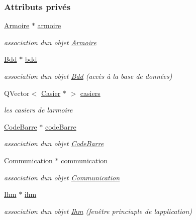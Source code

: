 \subsubsection*{Attributs privés}
\begin{DoxyCompactItemize}
\item 
\hyperlink{class_armoire}{Armoire} $\ast$ \hyperlink{class_supervision_a9f974b5c47899192395e539a0f11034c}{armoire}
\begin{DoxyCompactList}\small\item\em association d\textquotesingle{}un objet \hyperlink{class_armoire}{Armoire} \end{DoxyCompactList}\item 
\hyperlink{class_bdd}{Bdd} $\ast$ \hyperlink{class_supervision_ac9a970d4f511f2eed5da4aed037533ab}{bdd}
\begin{DoxyCompactList}\small\item\em association d\textquotesingle{}un objet \hyperlink{class_bdd}{Bdd} (accès à la base de données) \end{DoxyCompactList}\item 
Q\+Vector$<$ \hyperlink{class_casier}{Casier} $\ast$ $>$ \hyperlink{class_supervision_a3ac996538c83f3bd3df36095b0abb1b2}{casiers}
\begin{DoxyCompactList}\small\item\em les casiers de l\textquotesingle{}armoire \end{DoxyCompactList}\item 
\hyperlink{class_code_barre}{Code\+Barre} $\ast$ \hyperlink{class_supervision_ac01c57f7fd9d043ab46d439e55e426e5}{code\+Barre}
\begin{DoxyCompactList}\small\item\em association d\textquotesingle{}un objet \hyperlink{class_code_barre}{Code\+Barre} \end{DoxyCompactList}\item 
\hyperlink{class_communication}{Communication} $\ast$ \hyperlink{class_supervision_a045be64d74de4f7688574eec108220a5}{communication}
\begin{DoxyCompactList}\small\item\em association d\textquotesingle{}un objet \hyperlink{class_communication}{Communication} \end{DoxyCompactList}\item 
\hyperlink{class_ihm}{Ihm} $\ast$ \hyperlink{class_supervision_a5aa823c55bf1531497bbb8fdbc6c5528}{ihm}
\begin{DoxyCompactList}\small\item\em association d\textquotesingle{}un objet \hyperlink{class_ihm}{Ihm} (fenêtre princiaple de l\textquotesingle{}application) \end{DoxyCompactList}\item 

\end{DoxyCompactItemize}
